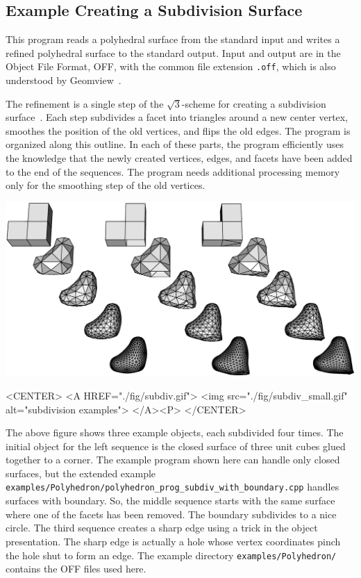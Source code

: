 \subsection{Example Creating a Subdivision Surface}

This program reads a polyhedral surface from the standard input and
writes a refined polyhedral surface to the standard output. Input and
output are in the Object File Format, OFF, with the common file
extension {\tt .off}, which is also understood by
Geomview~\cite{cgal:p-gmgv16-96}.

The refinement is a single step of the $\sqrt{3}$-scheme for creating
a subdivision surface~\cite{cgal:k-s-00}. Each step subdivides a facet
into triangles around a new center vertex, smoothes the position of the
old vertices, and flips the old edges. The program is organized along
this outline. In each of these parts, the program efficiently uses the
knowledge that the newly created vertices, edges, and facets have been
added to the end of the sequences. The program needs additional
processing memory only for the smoothing step of the old vertices.

\begin{ccTexOnly}
    \begin{center}
      \parbox{\textwidth}{%
          \includegraphics[width=\textwidth]{Polyhedron/fig/subdiv}%
      }
    \end{center}
\end{ccTexOnly}

\begin{ccHtmlOnly}
    <CENTER>
        <A HREF="./fig/subdiv.gif">
            <img src="./fig/subdiv_small.gif" alt="subdivision examples">
        </A><P>
    </CENTER>
\end{ccHtmlOnly}

The above figure shows three example objects, each 
subdivided four times. The initial object for the left sequence is
the closed surface of three unit cubes glued together to a corner.
The example program shown here can handle only closed surfaces, 
but the extended example
\texttt{examples/Polyhedron/polyhedron\_prog\_subdiv\_with\_boundary.cpp}
handles surfaces with boundary. So, the middle sequence starts with
the same surface where one of the facets has been removed. The boundary
subdivides to a nice circle. The third sequence creates a sharp
edge using a trick in the object presentation. The sharp edge is 
actually a hole whose vertex coordinates pinch the hole shut to form an
edge. The example directory \texttt{examples/Polyhedron/} contains the 
OFF files used here.

